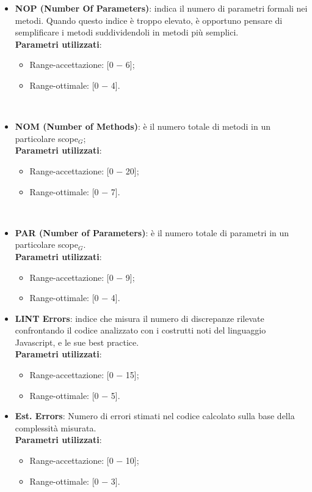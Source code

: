 \begin{itemize}
		\item \textbf{NOP (Number Of Parameters)}: indica il numero di parametri formali nei metodi. Quando questo indice è troppo elevato, è opportuno pensare di semplificare i metodi suddividendoli in metodi più semplici. \\
		
		\textbf{Parametri utilizzati}:
		\begin{itemize}
			\item Range-accettazione: [0 − 6];
			\item Range-ottimale: [0 − 4].
		\end{itemize} \\ \bigskip

		\item \textbf{NOM (Number of Methods)}: è il numero totale di metodi in un particolare scope$_G$; \\
		
		\textbf{Parametri utilizzati}:
		\begin{itemize}
			\item Range-accettazione: [0 − 20];
			\item Range-ottimale: [0 − 7].
		\end{itemize} \\ \bigskip

		\item \textbf{PAR (Number of Parameters)}: è il numero totale di parametri in un particolare scope$_G$. \\
		
		\textbf{Parametri utilizzati}:
		\begin{itemize}
			\item Range-accettazione: [0 − 9];
			\item Range-ottimale: [0 − 4].
		\end{itemize}
		
		\item \textbf{LINT Errors}:  indice che misura il numero di discrepanze rilevate confrontando il codice analizzato con i costrutti noti del linguaggio Javascript, e le sue best practice.\\
		
		\textbf{Parametri utilizzati}:
		\begin{itemize}
			\item Range-accettazione: [0 − 15];
			\item Range-ottimale: [0 − 5].
		\end{itemize}
		
		\item \textbf{Est. Errors}:  Numero di errori stimati nel codice calcolato sulla base della complessità misurata.\\
		
		\textbf{Parametri utilizzati}:
		\begin{itemize}
			\item Range-accettazione: [0 − 10];
			\item Range-ottimale: [0 − 3].
		\end{itemize}
	\end{itemize}

